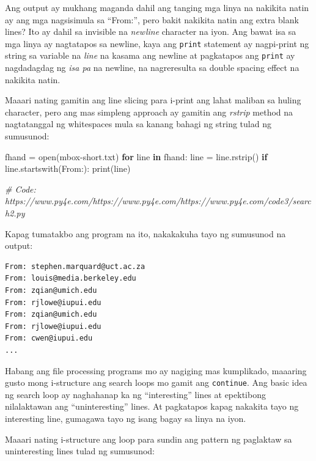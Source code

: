 \documentclass[10pt,]{book}
\newenvironment{Shaded}{}{}
\newcommand{\BuiltInTok}[1]{\textcolor[rgb]{0.00,0.50,0.00}{#1}}
\newcommand{\CommentTok}[1]{\textcolor[rgb]{0.38,0.63,0.69}{\textit{#1}}}
\newcommand{\ControlFlowTok}[1]{\textcolor[rgb]{0.00,0.44,0.13}{\textbf{#1}}}
\newcommand{\KeywordTok}[1]{\textcolor[rgb]{0.00,0.44,0.13}{\textbf{#1}}}
\newcommand{\NormalTok}[1]{#1}
\newcommand{\OperatorTok}[1]{\textcolor[rgb]{0.40,0.40,0.40}{#1}}
\newcommand{\StringTok}[1]{\textcolor[rgb]{0.25,0.44,0.63}{#1}}
\begin{document}
Ang output ay mukhang maganda dahil ang tanging mga linya na nakikita
natin ay ang mga nagsisimula sa ``From:'', pero bakit nakikita natin ang
extra blank lines? Ito ay dahil sa invisible na \emph{newline} character
na iyon. Ang bawat isa sa mga linya ay nagtatapos sa newline, kaya ang
\texttt{print} statement ay nagpi-print ng string sa variable na
\emph{line} na kasama ang newline at pagkatapos ang \texttt{print} ay
nagdadagdag ng \emph{isa pa} na newline, na nagreresulta sa double
spacing effect na nakikita natin.

Maaari nating gamitin ang line slicing para i-print ang lahat maliban sa
huling character, pero ang mas simpleng approach ay gamitin ang
\emph{rstrip} method na nagtatanggal ng whitespaces mula sa kanang
bahagi ng string tulad ng sumusunod:

\begin{Shaded}
\begin{Highlighting}[]
\NormalTok{fhand }\OperatorTok{=} \BuiltInTok{open}\NormalTok{(}\StringTok{\textquotesingle{}mbox{-}short.txt\textquotesingle{}}\NormalTok{)}
\ControlFlowTok{for}\NormalTok{ line }\KeywordTok{in}\NormalTok{ fhand:}
\NormalTok{    line }\OperatorTok{=}\NormalTok{ line.rstrip()}
    \ControlFlowTok{if}\NormalTok{ line.startswith(}\StringTok{\textquotesingle{}From:\textquotesingle{}}\NormalTok{):}
        \BuiltInTok{print}\NormalTok{(line)}

\CommentTok{\# Code: https://www.py4e.com/https://www.py4e.com/https://www.py4e.com/code3/search2.py}
\end{Highlighting}
\end{Shaded}


Kapag tumatakbo ang program na ito, nakakakuha tayo ng sumusunod na
output:

{\small
\begin{verbatim}
From: stephen.marquard@uct.ac.za
From: louis@media.berkeley.edu
From: zqian@umich.edu
From: rjlowe@iupui.edu
From: zqian@umich.edu
From: rjlowe@iupui.edu
From: cwen@iupui.edu
...
\end{verbatim}
}

Habang ang file processing programs mo ay nagiging mas kumplikado,
maaaring gusto mong i-structure ang search loops mo gamit ang
\texttt{continue}. Ang basic idea ng search loop ay naghahanap ka ng
``interesting'' lines at epektibong nilalaktawan ang ``uninteresting''
lines. At pagkatapos kapag nakakita tayo ng interesting line, gumagawa
tayo ng isang bagay sa linya na iyon.

Maaari nating i-structure ang loop para sundin ang pattern ng paglaktaw
sa uninteresting lines tulad ng sumusunod:
\end{document}
